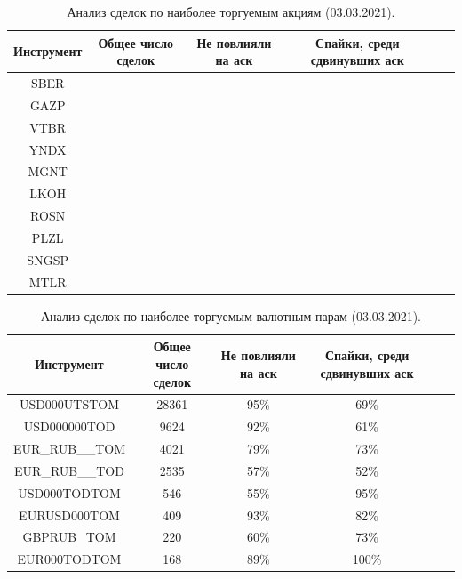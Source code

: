\begin{table}[h!]
    \begin{center}
        \begin{tabular}{|c|c|c|c|c|c|}
            \hline
        Инструмент   & Общее число сделок & Не повлияли на аск & Спайки, среди сдвинувших аск \\ \hline
        SBER  &     \\ \hline
        GAZP  &   \\ \hline
        VTBR  &   \\ \hline
        YNDX  &   \\ \hline
        MGNT  &   \\ \hline
        LKOH  &   \\ \hline
        ROSN  &   \\ \hline
        PLZL  &   \\ \hline
        SNGSP &   \\ \hline
        MTLR  &   \\ \hline
        \end{tabular}
    \end{center}
    \label{tableanalSE}
    \caption{Анализ сделок по наиболее торгуемым акциям (03.03.2021).}
\end{table} 

\begin{table}[h!]
    \begin{center}
        \begin{tabular}{|c|c|c|c|c|c|}
            \hline
        Инструмент        & Общее число сделок & Не повлияли на аск & Спайки, среди сдвинувших аск \\ \hline
        USD000UTSTOM & 28361 &    95\% & 69\% \\ \hline
        USD000000TOD & 9624 &     92\% & 61\% \\ \hline
        EUR\_RUB\_\_TOM & 4021 &  79\% & 73\% \\ \hline
        EUR\_RUB\_\_TOD & 2535 &  57\% & 52\% \\ \hline
        USD000TODTOM & 546 &      55\% & 95\% \\ \hline
        EURUSD000TOM & 409 &      93\% & 82\% \\ \hline
        GBPRUB\_TOM & 220 &       60\% & 73\% \\ \hline
        EUR000TODTOM & 168 &      89\% & 100\%  \\ \hline
        \end{tabular}
    \end{center}
    \label{tableanalCU}
    \caption{Анализ сделок по наиболее торгуемым валютным парам (03.03.2021).}
\end{table} 

